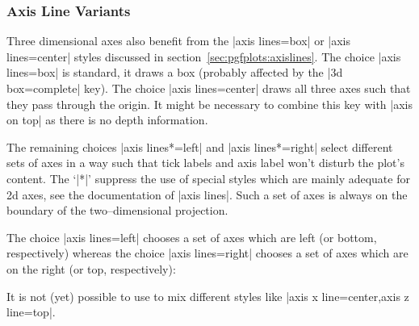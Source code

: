 


\subsubsection{Axis Line Variants}
\label{sec:pgfplots:axislines:3d}
Three dimensional axes also benefit from the |axis lines=box| or |axis lines=center| styles discussed in section~\ref{sec:pgfplots:axislines}. The choice |axis lines=box| is standard, it draws a box (probably affected by the |3d box=complete| key). 
The choice |axis lines=center| draws all three axes such that they pass through the origin. It might be necessary to combine this key with |axis on top| as there is no depth information.

\begin{codeexample}[]
\end{codeexample}

The remaining choices |axis lines*=left| and |axis lines*=right| select different sets of axes in a way such that tick labels and axis label won't disturb the plot's content. The `|*|' suppress the use of special styles which are mainly adequate for 2d axes, see the documentation of |axis lines|. Such a set of axes is always on the boundary of the two--dimensional projection.  

The choice |axis lines=left| chooses a set of axes which are left (or bottom, respectively) whereas the choice |axis lines=right| chooses a set of axes which are on the right (or top, respectively):

\begin{codeexample}[]
\end{codeexample}

\begin{codeexample}[]
\end{codeexample}

It is not (yet) possible to use to mix different styles like |axis x line=center,axis z line=top|.

